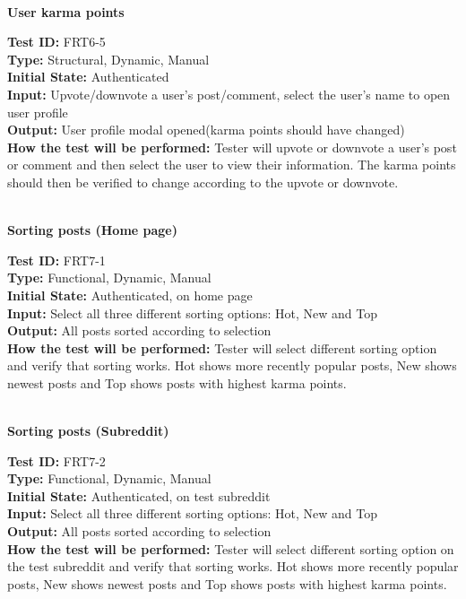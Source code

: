 \documentclass[12pt,fleqn]{article}
\begin{document}
\textbf{\\User karma points}
\begin{tcolorbox}
\textbf{Test ID:} FRT6-5\\ %
\textbf{Type:} Structural, Dynamic, Manual\\
\textbf{Initial State:} Authenticated\\
\textbf{Input:} Upvote/downvote a user's post/comment, select the user's name to open user profile  \\
\textbf{Output:} User profile modal opened(karma points should have changed)\\
\textbf{How the test will be performed:} Tester will upvote or downvote a user's post or comment and then select the user to view their information. The karma points should then be verified to change according to the upvote or downvote.
\end{tcolorbox}

\textbf{\\Sorting posts (Home page)}
\begin{tcolorbox}
\textbf{Test ID:} FRT7-1\\
\textbf{Type:} Functional, Dynamic, Manual\\
\textbf{Initial State:} Authenticated, on home page\\
\textbf{Input:} Select all three different sorting options: Hot, New and Top \\
\textbf{Output:} All posts sorted according to selection\\
\textbf{How the test will be performed:} Tester will select different sorting option and verify that sorting works. Hot shows more recently popular posts, New shows newest posts and Top shows posts with highest karma points.
\end{tcolorbox}

\textbf{\\Sorting posts (Subreddit)}
\begin{tcolorbox}
\textbf{Test ID:} FRT7-2\\
\textbf{Type:} Functional, Dynamic, Manual\\
\textbf{Initial State:} Authenticated, on test subreddit\\
\textbf{Input:} Select all three different sorting options: Hot, New and Top \\
\textbf{Output:} All posts sorted according to selection\\
\textbf{How the test will be performed:} Tester will select different sorting option on the test subreddit and verify that sorting works. Hot shows more recently popular posts, New shows newest posts and Top shows posts with highest karma points.
\end{tcolorbox}
\end{document}
